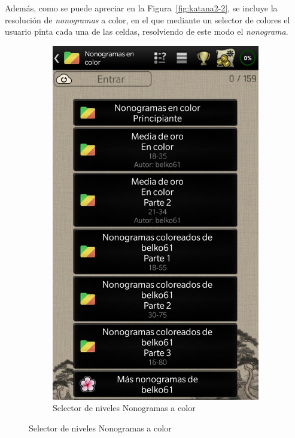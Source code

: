 \documentclass[11pt,spanish,listoffigures,listoftables]{tfgetsinf}
\begin{document}
 Además, como se puede apreciar en la Figura~\ref{fig:katana2-2}, se incluye la resolución de \textit{nonogramas} a color, en el que mediante un selector
 de colores el usuario pinta cada una de las celdas, resolviendo de este modo el \textit{nonograma}.

 \begin{figure}[H]
   \centering
   \begin{subfigure}[b]{0.47\linewidth}
     \includegraphics[width=\linewidth]{images/nonokatana2.jpg}
     \caption{Selector de niveles Nonogramas a color}
     \label{fig:katana2-1}

\end{subfigure}
\end{figure}
\end{document}
